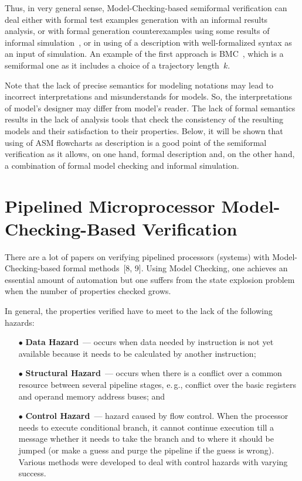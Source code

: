 \begin{multicols}{2}
   Thus, in very general sense, Model-Checking-based semiformal verification can deal either 
with formal test examples generation with an informal results analysis, or with formal generation 
counterexamples using some results of informal simulation~\cite{8fr}, or in using of a 
description with well-formalized syntax as an input of simulation. An example of the first 
approach is BMC~\cite{3fr}, which is a semiformal one as it includes a 
choice of a trajectory length~$k$.
   
   Note that the lack of precise semantics for modeling notations may lead to incorrect 
interpretations and misunderstands for models. So, the interpretations of model's designer may 
differ from model's reader. The lack of formal semantics results in the lack of analysis tools that 
check the consistency of the resulting models and their satisfaction to their properties. Below, 
it will be shown that using of ASM flowcharts as description is a good point of the semiformal verification 
as it allows, on one hand, formal description and, on the other hand, a combination of formal 
model checking and informal simulation.
     
\section{Pipelined Microprocessor Model-Checking-Based Verification}

\noindent
There are a lot of papers on verifying pipelined processors (systems) with 
Model-Checking-based formal methods~[8, 9]. Using Model Checking, one achieves an essential 
amount of automation but one suffers from the state explosion problem when the number of 
properties checked grows. 
       
       In general, the properties verified have to meet to the lack of the following hazards:
       \begin{itemize}
\item[$\bullet$] \textbf{Data Hazard}~--- occurs when data needed by instruction is not yet 
available because it needs to be calculated by another instruction;
\item[$\bullet$] \textbf{Structural Hazard}~--- occurs when there is a conflict over a 
common resource between several pipeline stages, e.\,g., conflict over the basic registers and 
operand memory address buses; and
\item[$\bullet$] \textbf{Control Hazard}~--- hazard caused by flow control. When the 
processor needs to execute conditional branch, it cannot continue execution till a message 
whether it needs to take the branch and to where it should be jumped (or make a guess and 
purge the pipeline if the guess is wrong). Various methods were developed to deal with 
control hazards with varying success.
\end{itemize}


\end{multicols}
